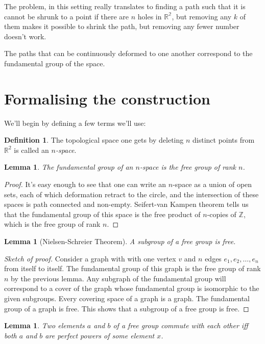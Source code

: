 \documentclass[12pt]{article}
\newtheorem{lem}[thm]{Lemma}
\theoremstyle{definition}
\newtheorem{defn}{Definition}[section]
\begin{document}
The problem, in this setting really translates to finding a path such that it is cannot be shrunk to a point if there are $n$ holes in $\mathbb{R^2}$, but removing any $k$ of them makes it possible to shrink the path, but removing any fewer number doesn't work.

The paths that can be continuously deformed to one another correspond to the fundamental group of the space.

\section{Formalising the construction}
We'll begin by defining a few terms we'll use:

\begin{defn}
The topological space one gets by deleting $n$ distinct points from $\mathbb{R}^2$ is called an \emph{$n$-space}.
\end{defn}

\begin{lem}
The \emph{fundamental group} of an $n$-space is the free group of rank $n$.
\end{lem}

\begin{proof}
    It's easy enough to see that one can write an $n$-space as a union of open sets, each of which deformation retract to the circle, and the intersection of these spaces is path connected and non-empty. Seifert-van Kampen theorem tells us that the fundamental group of this space is the free product of $n$-copies of $\mathbb{Z}$, which is the free group of rank $n$.
\end{proof}

\begin{lem}[Nielsen-Schreier Theorem]\label{subg}
A subgroup of a free group is free.
\end{lem}

\begin{proof}[Sketch of proof]
    Consider a graph with with one vertex $v$ and $n$ edges $e_1, e_2, \ldots , e_n$ from itself to itself. The fundamental group of this graph is the free group of rank $n$ by the previous lemma. Any subgraph of the fundamental group will correspond to a cover of the graph whose fundamental group is isomorphic to the given subgroups.  Every covering space of a graph is a graph. The fundamental group of a graph is free. This shows that a subgroup of a free group is free.
\end{proof}

\begin{lem}\label{impo}
Two elements $a$ and $b$ of a free group commute with each other iff both $a$ and $b$ are perfect powers of some element $x$.
\end{lem}
\end{document}
